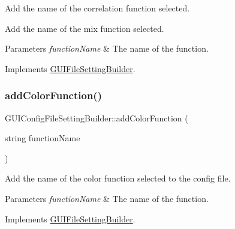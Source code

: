 Add the name of the correlation function selected. 

Add the name of the mix function selected.


\begin{DoxyParams}{Parameters}
{\em function\+Name} & The name of the function. \\
\hline
\end{DoxyParams}


Implements \mbox{\hyperlink{class_g_u_i_file_setting_builder_a03833a30982887633f6b9d0e3d71e1f8}{G\+U\+I\+File\+Setting\+Builder}}.

\mbox{\label{class_g_u_i_config_file_setting_builder_a5275c0c1258a3088674bc1ef009e1ea3}} 
\subsubsection{\texorpdfstring{add\+Color\+Function()}{addColorFunction()}}
{\footnotesize\ttfamily G\+U\+I\+Config\+File\+Setting\+Builder\+::add\+Color\+Function (\begin{DoxyParamCaption}\item[{string}]{function\+Name }\end{DoxyParamCaption})\hspace{0.3cm}{\ttfamily [virtual]}}



Add the name of the color function selected to the config file. 


\begin{DoxyParams}{Parameters}
{\em function\+Name} & The name of the function. \\
\hline
\end{DoxyParams}


Implements \mbox{\hyperlink{class_g_u_i_file_setting_builder_a640a258d617394edf010da3feaf80e11}{G\+U\+I\+File\+Setting\+Builder}}.

\mbox{\label{class_g_u_i_config_file_setting_builder_ac7f7238c200dc4000951b24ead586847}} 
